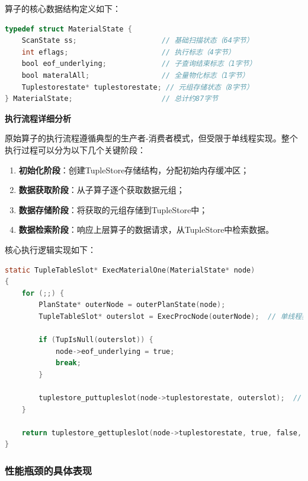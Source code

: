 算子的核心数据结构定义如下：

\begin{lstlisting}[language=C, caption=原始MaterialState结构定义]
typedef struct MaterialState {
    ScanState ss;                    // 基础扫描状态（64字节）
    int eflags;                      // 执行标志（4字节）
    bool eof_underlying;             // 子查询结束标志（1字节）
    bool materalAll;                 // 全量物化标志（1字节）
    Tuplestorestate* tuplestorestate; // 元组存储状态（8字节）
} MaterialState;                     // 总计约87字节
\end{lstlisting}

\textbf{执行流程详细分析}

原始算子的执行流程遵循典型的生产者-消费者模式，但受限于单线程实现。整个执行过程可以分为以下几个关键阶段：

\begin{enumerate}
    \item \textbf{初始化阶段}：创建TupleStore存储结构，分配初始内存缓冲区；
    \item \textbf{数据获取阶段}：从子算子逐个获取数据元组；
    \item \textbf{数据存储阶段}：将获取的元组存储到TupleStore中；
    \item \textbf{数据检索阶段}：响应上层算子的数据请求，从TupleStore中检索数据。
\end{enumerate}

核心执行逻辑实现如下：

\begin{lstlisting}[language=C, caption=原始ExecMaterialOne函数核心逻辑]
static TupleTableSlot* ExecMaterialOne(MaterialState* node)
{
    for (;;) {
        PlanState* outerNode = outerPlanState(node);
        TupleTableSlot* outerslot = ExecProcNode(outerNode);  // 单线程获取
        
        if (TupIsNull(outerslot)) {
            node->eof_underlying = true;
            break;
        }
        
        tuplestore_puttupleslot(node->tuplestorestate, outerslot);  // 串行存储
    }
    
    return tuplestore_gettupleslot(node->tuplestorestate, true, false, slot);
}
\end{lstlisting}

\subsubsection{性能瓶颈的具体表现}

